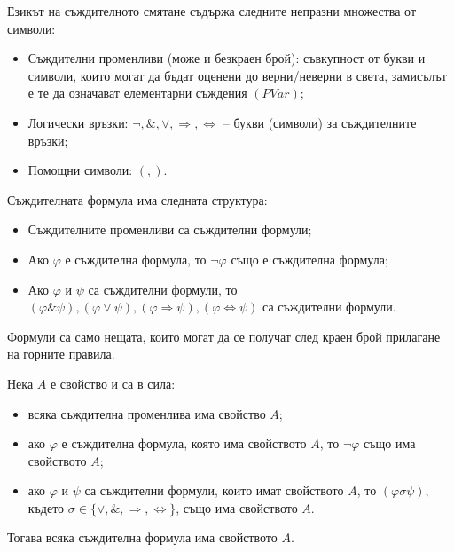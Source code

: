 \documentclass{article}
\begin{document}
\begin{mydef}
Езикът на съждителното смятане съдържа следните непразни множества от символи:
\begin{itemize}
\item Съждителни променливи (може и безкраен брой): съвкупност от букви и символи, които могат да бъдат оценени до верни/неверни в света, замисълът е те да означават елементарни съждения $(PVar)$;
\item Логически връзки: $\neg, \&, \lor, \Rightarrow, \Leftrightarrow$ -- букви (символи) за съждителните връзки;
\item Помощни символи: $(, )$.
\end{itemize}
\end{mydef}

\begin{mydef}
Съждителната формула има следната структура:
\begin{itemize}
\item Съждителните променливи са съждителни формули;
\item Ако $\varphi$ е съждителна формула, то $\neg\varphi$ също е съждителна формула;
\item Ако $\varphi$ и $\psi$ са съждителни формули, то $(\varphi \& \psi), (\varphi \lor \psi), (\varphi \Rightarrow \psi), (\varphi \Leftrightarrow \psi)$ са съждителни формули.
\end{itemize}
Формули са само нещата, които могат да се получат след краен брой прилагане на горните правила.
\end{mydef}

\begin{mydef}
Нека $A$ е свойство и са в сила:
\begin{itemize}
\item всяка съждителна променлива има свойство $A$;
\item ако $\varphi$ е съждителна формула, която има свойството $A$, то $\neg \varphi$ също има свойството $A$;
\item ако $\varphi$ и $\psi$ са съждителни формули, които имат свойството $A$, то $(\varphi \sigma \psi)$, където $\sigma \in \{\lor, \&, \Rightarrow, \Leftrightarrow\}$, също има свойството $A$.
\end{itemize}
Тогава всяка съждителна формула има свойството $A$.
\end{mydef}
\end{document}
